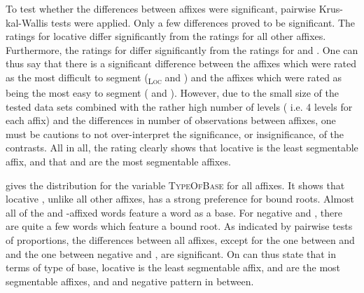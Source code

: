 \largerpage To test whether the differences between affixes were significant, pairwise Krus-kal-Wallis tests were applied.  Only a few differences proved to be significant. The ratings for locative  differ significantly from the ratings for all other affixes. Furthermore, the ratings for  differ significantly from the ratings for  and . 
One can thus say that there is a significant difference between the affixes which were rated as the most difficult to segment (\textsubscript{\textsc{Loc}} and ) and the affixes which were rated as being the most easy to segment ( and ). However, due to the small size of the tested data sets combined with the rather high number of levels ( i.e. 4 levels for each affix) and the differences in number of observations between affixes, one must be cautions to not over-interpret the significance, or insignificance, of the contrasts. 
All in all, the rating clearly shows that locative  is the least segmentable affix, and that  and  are the most segmentable affixes.



 gives the distribution for the variable \textsc{TypeOfBase} for all affixes. It shows that locative , unlike all other affixes, has a strong preference for bound roots. Almost all of the  and -affixed words feature a word as a base. For negative  and , there are quite a few words which feature a bound root. As indicated by pairwise tests of proportions, the differences between all affixes, except for the one between  and  and the one between negative  and , are significant. On can thus state that in terms of type of base, locative  is the least segmentable affix,  and  are the most segmentable affixes, and  and negative  pattern in between.

